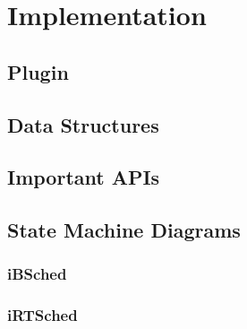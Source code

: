 \chapter{Implementation}\label{chapter:implementation}
\section{Plugin}
\section{Data Structures}
\section{Important APIs}
\section{State Machine Diagrams}
\subsection{iBSched}
\subsection{iRTSched}
